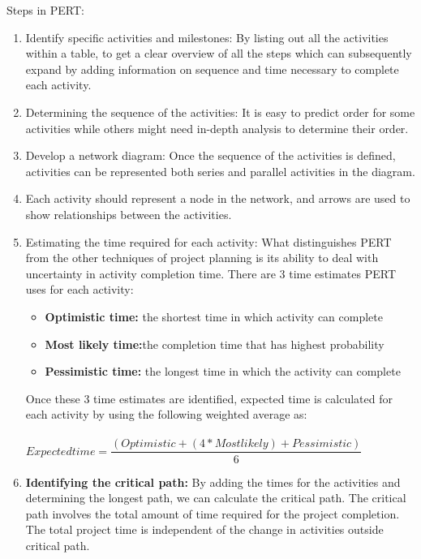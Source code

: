 Steps in PERT:

\begin{enumerate}
	\item Identify specific activities and milestones: By listing out all the activities within a table, to get a clear overview of all the steps which can subsequently expand by adding information on sequence and time necessary to complete each activity.
	
	\item Determining the sequence of the activities: It is easy to predict order for some activities while others might need in-depth analysis to determine their order.
	\item Develop a network diagram: Once the sequence of the activities is defined, activities can be represented both series and parallel activities in the diagram.
	\item Each activity should represent a node in the network, and arrows are used to show relationships between the activities.
	\item Estimating the time required for each activity: What distinguishes PERT from the other techniques of project planning is its ability to deal with uncertainty in activity completion time. There are 3 time estimates PERT uses for each activity:
	\begin{itemize}
		\item \textbf{Optimistic time:} the shortest time in which activity can complete 
		\item \textbf{Most likely time:}the completion time that has highest probability 
		\item \textbf{Pessimistic  time:} the longest time in which the activity can complete 
	\end{itemize}
Once these 3 time estimates are identified, expected time is calculated for each activity by using the following weighted average as:\\
\\
$Expected time = \dfrac{(Optimistic + (4* Most likely) + Pessimistic)}{6} $
		\item \textbf{Identifying the critical path:}  By adding the times for the activities and determining the longest path, we can calculate the critical path. The critical path involves the total amount of time required for the project completion. The total project time is independent of the change in activities outside critical path.
		
\end{enumerate}


